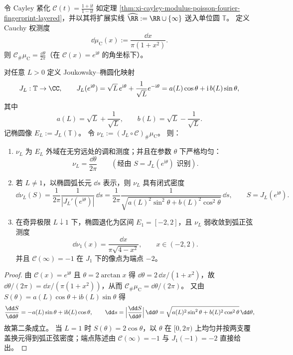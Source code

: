 \begin{theorem}\label{thm:xi-cayley-joukowsky-harmonic-measure-ellipse}
令 Cayley 紧化 \(\mathcal C(t)=\frac{1+\mathrm{i}t}{1-\mathrm{i}t}\) 如定理
\ref{thm:xi-cayley-modulus-poisson-fourier-fingerprint-layered}，并以其将扩展实线
\(\widehat{\RR}:=\RR\cup\{\infty\}\) 送入单位圆 \(\mathbb T\)。
定义 Cauchy 权测度
\[
\dd\mu_{\mathrm C}(x):=\frac{\dd x}{\pi(1+x^2)}.
\]
则 \(\mathcal C_\#\mu_{\mathrm C}=\frac{\dd\theta}{2\pi}\)（在 \(\mathcal C(x)=e^{\mathrm{i}\theta}\) 的角坐标下）。
\par
对任意 \(L>0\) 定义 Joukowsky--椭圆化映射
\[
J_L:\mathbb T\to\CC,\qquad
J_L(e^{\mathrm{i}\theta})
=\sqrt{L}\,e^{\mathrm{i}\theta}+\frac{1}{\sqrt{L}}e^{-\mathrm{i}\theta}
=a(L)\cos\theta+\mathrm{i}\,b(L)\sin\theta,
\]
其中
\[
a(L)=\sqrt{L}+\frac{1}{\sqrt{L}},\qquad
b(L)=\sqrt{L}-\frac{1}{\sqrt{L}}.
\]
记椭圆像 \(E_L:=J_L(\mathbb T)\)。
令 \(\nu_L:=(J_L\circ \mathcal C)_\#\mu_{\mathrm C}\)。
则：
\begin{enumerate}
  \item \(\nu_L\) 为 \(E_L\) 外域在无穷远处的调和测度；并且在参数 \(\theta\) 下严格均匀：
  \[
  \nu_L=\frac{\dd\theta}{2\pi}\qquad(\text{经由 }S=J_L(e^{\mathrm{i}\theta})\text{ 识别}).
  \]
  \item 若 \(L\neq 1\)，以椭圆弧长元 \(\dd s\) 表示，则 \(\nu_L\) 具有闭式密度
  \[
  \dd\nu_L(S)
  =\frac{1}{2\pi}\frac{1}{|J_L'(e^{\mathrm{i}\theta})|}\,\dd s
  =\frac{1}{2\pi}\frac{1}{\sqrt{a(L)^2\sin^2\theta+b(L)^2\cos^2\theta}}\,\dd s,
  \qquad S=J_L(e^{\mathrm{i}\theta}).
  \]
  \item 在奇异极限 \(L\downarrow 1\) 下，椭圆退化为区间 \(E_1=[-2,2]\)，且 \(\nu_L\) 弱收敛到弧正弦测度
  \[
  \dd\nu_1(x)=\frac{\dd x}{\pi\sqrt{4-x^2}},\qquad x\in(-2,2).
  \]
  并且 \(\mathcal C(\infty)=-1\) 在 \(J_1\) 下的像点为端点 \(-2\)。
\end{enumerate}
\end{theorem}
\begin{proof}
由 \(\mathcal C(x)=e^{\mathrm{i}\theta}\) 且 \(\theta=2\arctan x\) 得
\(
\dd\theta=2\,\dd x/(1+x^2)
\)，故
\(
\dd\theta/(2\pi)=\dd x/(\pi(1+x^2))
\)，从而 \(\mathcal C_\#\mu_{\mathrm C}=\dd\theta/(2\pi)\)。
又由
\(
S(\theta)=a(L)\cos\theta+\mathrm{i}b(L)\sin\theta
\)
得
\[
\frac{\dd S}{\dd\theta}=-a(L)\sin\theta+\mathrm{i}b(L)\cos\theta,\qquad
\dd s=\Bigl|\frac{\dd S}{\dd\theta}\Bigr|\,\dd\theta
=\sqrt{a(L)^2\sin^2\theta+b(L)^2\cos^2\theta}\,\dd\theta,
\]
故第二条成立。
当 \(L=1\) 时 \(S(\theta)=2\cos\theta\)，以 \(\theta\) 在 \([0,2\pi)\) 上均匀并按两支覆盖换元得到弧正弦密度；端点陈述由 \(\mathcal C(\infty)=-1\) 与 \(J_1(-1)=-2\) 直接给出。
\end{proof}

